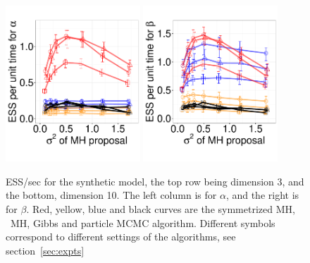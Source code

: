 {\begin{figure}[H]
\begin{minipage}[!hp]{0.99\linewidth}
\begin{minipage}[!hp]{0.99\linewidth}
  \end{minipage}
  \centering
  \begin{minipage}[!hp]{0.99\linewidth}
    \includegraphics [width=0.45\textwidth, angle=0]{figs/exp_10_alpha.pdf}
    \includegraphics [width=0.45\textwidth, angle=0]{figs/exp_10_beta.pdf}
  \end{minipage}
  \end{minipage}
    \caption{ESS/sec for the synthetic  model, the top row being dimension 3, and the bottom,
      dimension 10. The left column is for $\alpha$, and the 
    right is for $\beta$. Red, yellow, blue and black curves are the symmetrized MH,
  \naive\ MH, Gibbs and particle MCMC algorithm. Different symbols correspond
to different settings of the algorithms, see section~\ref{sec:expts}}
     \label{fig:ESS_EXP_D10}
  \end{figure}

  \begin{figure}[H]
  \centering


\end{figure}}

